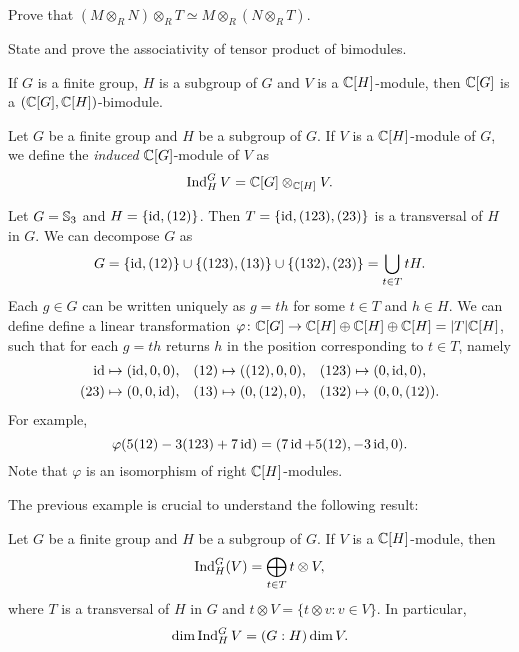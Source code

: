 \begin{exercise}
    Prove that  $(M\otimes_R N)\otimes_RT\simeq M\otimes_R (N\otimes_RT)$.
\end{exercise}

\begin{exercise}
    State and prove the associativity of tensor product of bimodules. 
\end{exercise}


If $G$ is a finite group, $H$ is a subgroup of $G$
and $V$ is a $\mathbb{C}[H]$-module, then  
$\mathbb{C}[G]$ is a $(\mathbb{C}[G],\mathbb{C}[H])$-bimodule.

\begin{definition}
Let $G$ be a finite group and  
$H$ be a subgroup of $G$. 
If $V$ is a $\mathbb{C}[H]$-module of $G$, 
we define the \emph{induced} $\mathbb{C}[G]$-module of $V$ 
as 
\[
\operatorname{Ind}_H^GV=\mathbb{C}[G]\otimes_{\mathbb{C}[H]}V.
\]
\end{definition}


\begin{example}
Let $G=\mathbb{S}_3$ and $H=\{\operatorname{id},(12)\}$. Then 
$T=\{\operatorname{id},(123),(23)\}$ is a transversal of $H$ in $G$. We can decompose $G$ as 
\[
G=\{\operatorname{id},(12)\}\cup \{(123),(13)\}\cup\{(132),(23)\}=\bigcup_{t\in T}tH.
\]
Each $g\in G$ can be written uniquely as $g=th$ for some $t\in T$ and $h\in H$. We can define define a linear transformation 
$\varphi\colon \mathbb{C}[G]\to \mathbb{C}[H]\oplus \mathbb{C}[H]\oplus \mathbb{C}[H]=|T|\mathbb{C}[H]$, such that for each $g=th$ returns $h$ in the position corresponding to $t\in T$, namely 
\begin{align*}
\operatorname{id}&\mapsto (\operatorname{id},0,0), && (12)\mapsto ((12),0,0), && (123)\mapsto (0,\operatorname{id},0),\\
(23)&\mapsto (0,0,\operatorname{id}), && (13)\mapsto (0,(12),0), && (132)\mapsto (0,0,(12)).
\end{align*}
For example, 
\[
\varphi( 5(12)-3(123)+7\operatorname{id} )=(7\operatorname{id}+5(12),-3\operatorname{id},0).
\]
Note that $\varphi$ is an isomorphism of right $\mathbb{C}[H]$-modules. 
\end{example}

The previous example is crucial to understand the following 
result:

\begin{proposition}
Let $G$ be a finite group and 
$H$ be a subgroup of $G$. If $V$ is a $\mathbb{C}[H]$-module, then  
\[
    \operatorname{Ind}_H^G(V)=\bigoplus_{t\in T}t\otimes V,
\]
where $T$ is a transversal of $H$ in $G$ and $t\otimes V=\{t\otimes v:v\in V\}$. In particular, 
\[
\dim\operatorname{Ind}_H^GV=(G:H)\dim V.
\]
\end{proposition}

